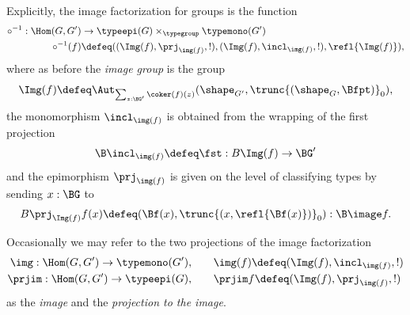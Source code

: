 \begin{definition}
  \label{def:image}
Explicitly, the image factorization for groups is the function
\begin{align*}
\circ^{-1}:\Hom(G,G')&\to\typeepi(G)\times_{\typegroup}\typemono(G')\\
\circ^{-1}(f)&\defeq ((\Img(f),\prj_{\img(f)},!),(\Img(f),\incl_{\img(f)},!),\refl{\Img(f)}),
\end{align*}
    where as before the \emph{image group} is the group
    $$\Img(f)\defeq \Aut_{\sum_{z:\BG'}\coker(f)(z)}(\sh_{G'},\trunc{(\sh_G,\Bfpt)}_0),$$
    the monomorphism $\incl_{\img(f)}$ is obtained from the wrapping of the first projection
    $$\B\incl_{\img(f)}\defeq\fst: B\Img(f)\to \BG'$$
    and
the epimorphism
  $\prj_{\img(f)}$  is given on the level of classifying types by sending $x:\BG$ to
  $$B\prj_{\Img(f)} f(x)\defeq (\Bf(x),\trunc{(x,\refl{\Bf(x)})}_0):\B\image f.$$

    
 Occasionally we may refer to the two projections of the image factorization
 \begin{align*}
    \img:\Hom(G,G')\to\typemono(G'),\qquad&\img(f)\defeq(\Img(f),\incl_{\img(f)},!)\\
 \prjim:\Hom(G,G')\to\typeepi(G), \qquad&\prjim f\defeq(\Img(f),\prj_{\img(f)},!)
  \end{align*}
  as the \emph{image} and the \emph{projection to the image}.
\end{definition}


